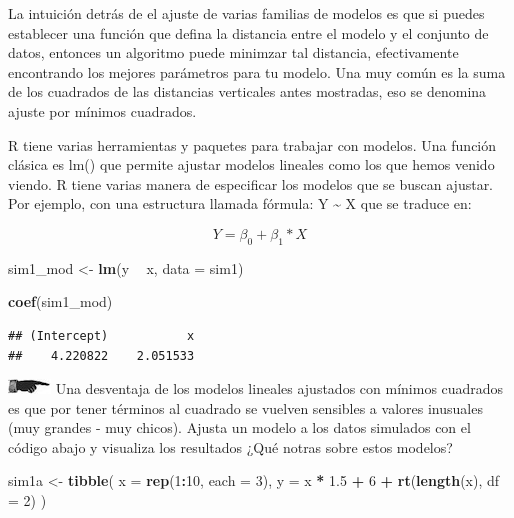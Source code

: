 \documentclass[]{book}
\newenvironment{Shaded}{\begin{snugshade}}{\end{snugshade}}
\newcommand{\KeywordTok}[1]{\textcolor[rgb]{0.13,0.29,0.53}{\textbf{#1}}}
\newcommand{\DataTypeTok}[1]{\textcolor[rgb]{0.13,0.29,0.53}{#1}}
\newcommand{\DecValTok}[1]{\textcolor[rgb]{0.00,0.00,0.81}{#1}}
\newcommand{\FloatTok}[1]{\textcolor[rgb]{0.00,0.00,0.81}{#1}}
\newcommand{\StringTok}[1]{\textcolor[rgb]{0.31,0.60,0.02}{#1}}
\newcommand{\OperatorTok}[1]{\textcolor[rgb]{0.81,0.36,0.00}{\textbf{#1}}}
\newcommand{\NormalTok}[1]{#1}
\theoremstyle{definition}
\theoremstyle{definition}
\theoremstyle{definition}
\theoremstyle{remark}
\begin{document}
La intuición detrás de el ajuste de varias familias de modelos es que si
puedes establecer una función que defina la distancia entre el modelo y
el conjunto de datos, entonces un algoritmo puede minimzar tal
distancia, efectivamente encontrando los mejores parámetros para tu
modelo. Una muy común es la suma de los cuadrados de las distancias
verticales antes mostradas, eso se denomina ajuste por mínimos
cuadrados.

R tiene varias herramientas y paquetes para trabajar con modelos. Una
función clásica es lm() que permite ajustar modelos lineales como los
que hemos venido viendo. R tiene varias manera de especificar los
modelos que se buscan ajustar. Por ejemplo, con una estructura llamada
fórmula: Y \textasciitilde{} X que se traduce en:

\[ Y = \beta_{0} + \beta_{1}*X \]

\begin{Shaded}
\begin{Highlighting}[]
\NormalTok{sim1_mod <-}\StringTok{ }\KeywordTok{lm}\NormalTok{(y }\OperatorTok{~}\StringTok{ }\NormalTok{x, }\DataTypeTok{data =}\NormalTok{ sim1)}

\KeywordTok{coef}\NormalTok{(sim1_mod)}
\end{Highlighting}
\end{Shaded}

\begin{verbatim}
## (Intercept)           x 
##    4.220822    2.051533
\end{verbatim}

\includegraphics{./imagenes/manicule2.jpg} Una desventaja de los modelos
lineales ajustados con mínimos cuadrados es que por tener términos al
cuadrado se vuelven sensibles a valores inusuales (muy grandes - muy
chicos). Ajusta un modelo a los datos simulados con el código abajo y
visualiza los resultados ¿Qué notras sobre estos modelos?

\begin{Shaded}
\begin{Highlighting}[]
\NormalTok{sim1a <-}\StringTok{ }\KeywordTok{tibble}\NormalTok{(}
  \DataTypeTok{x =} \KeywordTok{rep}\NormalTok{(}\DecValTok{1}\OperatorTok{:}\DecValTok{10}\NormalTok{, }\DataTypeTok{each =} \DecValTok{3}\NormalTok{),}
  \DataTypeTok{y =}\NormalTok{ x }\OperatorTok{*}\StringTok{ }\FloatTok{1.5} \OperatorTok{+}\StringTok{ }\DecValTok{6} \OperatorTok{+}\StringTok{ }\KeywordTok{rt}\NormalTok{(}\KeywordTok{length}\NormalTok{(x), }\DataTypeTok{df =} \DecValTok{2}\NormalTok{)}
\NormalTok{)}
\end{Highlighting}
\end{Shaded}
\end{document}
